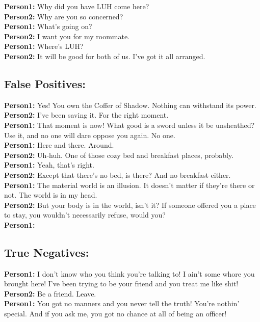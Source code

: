 \documentclass[
	letterpaper, %
	12pt, %
	unnumberedsections, %
	twoside, %
]{LTJournalArticle}
\begin{document}
\begin{appendices}
{		\noindent\textbf{Person1:}  Why did you have LUH come here? \\
		\noindent\textbf{Person2:}  Why are you so concerned? \\
		\noindent\textbf{Person1:}  What's going on? \\
		\noindent\textbf{Person2:}  I want you for my roommate. \\
		\noindent\textbf{Person1:}  Where's LUH? \\
		\noindent\textbf{Person2:}  It will be good for both of us. I've got it all arranged. \\


	}

	\subsection{False Positives:}
	{\ttfamily \tiny
		\noindent\textbf{Person1:}  Yes! You own the Coffer of Shadow. Nothing can withstand its power. \\
		\noindent\textbf{Person2:}  I've been saving it. For the right moment. \\
		\noindent\textbf{Person1:}  That moment is now! What good is a sword unless it be unsheathed? Use it, and no one will dare oppose you again. No one. \\

		\noindent\textbf{Person1:}  Here and there. Around. \\
		\noindent\textbf{Person2:}  Uh-huh. One of those cozy bed and breakfast places, probably. \\
		\noindent\textbf{Person1:}  Yeah, that's right. \\
		\noindent\textbf{Person2:}  Except that there's no bed, is there? And no breakfast either. \\
		\noindent\textbf{Person1:}  The material world is an illusion. It doesn't matter if they're there or not. The world is in my head. \\
		\noindent\textbf{Person2:}  But your body is in the world, isn't it?  If someone offered you a place to stay, you wouldn't necessarily refuse, would you? \\
		\noindent\textbf{Person1:}  \\


	}

	\subsection{True Negatives:}
	{\ttfamily \tiny
		\noindent\textbf{Person1:}  I don't know who you think you're talking to! I ain't some whore you brought here! I've been trying to be your friend and you treat me like shit! \\
		\noindent\textbf{Person2:}  Be a friend. Leave. \\
		\noindent\textbf{Person1:}  You got no manners and you never tell the truth! You're nothin' special. And if you ask me, you got no chance at all of being an officer! \\

}
\end{appendices}
\end{document}
